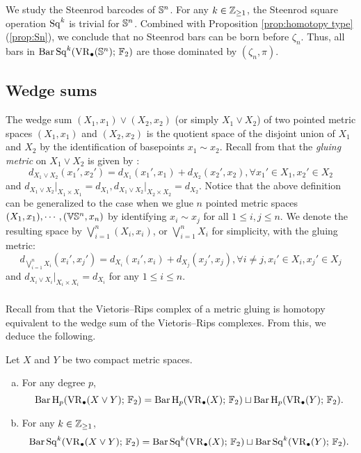 \subsubsection{} We study the Steenrod barcodes of $\mathbb{S}^n$.
For any $k \in \mathbb{Z}_{\geq 1}$, the Steenrod square operation $\operatorname{Sq}^k$ is trivial for $\mathbb{S}^n$.
Combined with Proposition \ref{prop:homotopy type} (\ref{prop:Sn}), we conclude that no Steenrod bars can be born before $\zeta_n$.
Thus, all bars in $\operatorname{Bar}\operatorname{Sq}^{k}(\operatorname{VR}_\bullet(\mathbb{S}^n);\,{\mathbb{F}_2})$ are those dominated by $(\zeta_n,\pi)$.

\subsection{Wedge sums}

The wedge sum $(X_1, x_1) \vee (X_2, x_2)$ (or simply $X_1 \vee X_2$) of two pointed metric spaces $(X_1, x_1)$ and $(X_2, x_2)$ is the quotient space of the disjoint union of $X_1$ and $X_2$ by the identification of basepoints $x_1 \sim x_2$.
Recall from \cite{burago2001course} that the \emph{gluing metric} on $X_1 \vee X_2$ is given by \label{para:gluing}:
\[
d_{X_1 \vee X_2}(x_1',x_2') = d_{X_1}(x_1',x_1)+d_{X_2}(x_2',x_2), \forall x_1' \in X_1, x_2' \in X_2
\]
and $d_{X_1 \vee X_2} \vert_{X_1 \times X_1} = d_{X_1},d_{X_1 \vee X_2} \vert_{X_2 \times X_2} = d_{X_2}$.
Notice that the above definition can be generalized to the case when we glue $n$ pointed metric spaces $(X_1,x_1),\cdots,(\mathbb{V}\mathbb{S}^n,x_n)$ by identifying $x_i\sim x_j$ for all $1 \leq i,j\leq n$.
We denote the resulting space by $\bigvee_{i=1}^n (X_i,x_i)$, or $\bigvee_{i=1}^n X_i$ for simplicity, with the gluing metric:
\[
d_{\bigvee_{i=1}^n X_i}(x_i',x_j') = d_{X_i}(x_i',x_i)+d_{X_j}(x_j',x_j),\forall i\neq j, x_i' \in X_i, x_j' \in X_j
\]
and $d_{X_i \vee X_i}|_{X_i\times X_i} = d_{X_i}$ for any $1\leq i\leq n$.

\subsubsection{}\label{prop:wedge sum}
Recall from \cite[Proposition 3.7]{adamaszek2020homotopy} that the Vietoris--Rips complex of a metric gluing is homotopy equivalent to the wedge sum of the Vietoris--Rips complexes.
From this, we deduce the following.

\medskip\proposition
Let $X$ and $Y$ be two compact metric spaces.
\begin{enumerate}[(a)]
	\item\label{prop:wedge sum pH} For any degree $p$,
	\begin{equation*}\label{eq:wedge sum pH}
		\operatorname{Bar} \operatorname{H}_{p}(\operatorname{VR}_\bullet(X \vee Y);\,{\mathbb{F}_2})= \operatorname{Bar} \operatorname{H}_{p}(\operatorname{VR}_\bullet(X);\,{\mathbb{F}_2})\sqcup \operatorname{Bar} \operatorname{H}_{p}(\operatorname{VR}_\bullet(Y);\,{\mathbb{F}_2}).
	\end{equation*}
	\item\label{prop:wedge sum Sq} For any $k \in \mathbb{Z}_{\geq 1}$,
	\begin{equation*}\label{eq:wedge sum Sq}
		\operatorname{Bar}\operatorname{Sq}^{k}(\operatorname{VR}_\bullet(X \vee Y);\,{\mathbb{F}_2})= \operatorname{Bar}\operatorname{Sq}^{k}(\operatorname{VR}_\bullet(X);\,{\mathbb{F}_2})\sqcup \operatorname{Bar}\operatorname{Sq}^{k}(\operatorname{VR}_\bullet(Y);\,{\mathbb{F}_2}).
	\end{equation*}
\end{enumerate}

